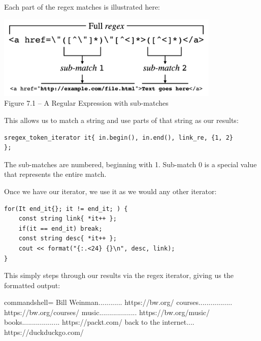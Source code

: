 Each part of the regex matches is illustrated here:

\begin{center}
\includegraphics[width=0.8\textwidth]{content/chapter7/images/1.png}\\
Figure 7.1 – A Regular Expression with sub-matches
\end{center}

This allows us to match a string and use parts of that string as our results:

\begin{lstlisting}[style=styleCXX]
sregex_token_iterator it{ in.begin(), in.end(), link_re, {1, 2}
};
\end{lstlisting}

The sub-matches are numbered, beginning with 1. Sub-match 0 is a special value that represents the entire match.

Once we have our iterator, we use it as we would any other iterator:

\begin{lstlisting}[style=styleCXX]
for(It end_it{}; it != end_it; ) {
	const string link{ *it++ };
	if(it == end_it) break;
	const string desc{ *it++ };
	cout << format("{:.<24} {}\n", desc, link);
}
\end{lstlisting}

This simply steps through our results via the regex iterator, giving us the formatted output:

\begin{tcblisting}{commandshell={}}
Bill Weinman............ https://bw.org/
courses................. https://bw.org/courses/
music................... https://bw.org/music/
books................... https://packt.com/
back to the internet.... https://duckduckgo.com/
\end{tcblisting}












